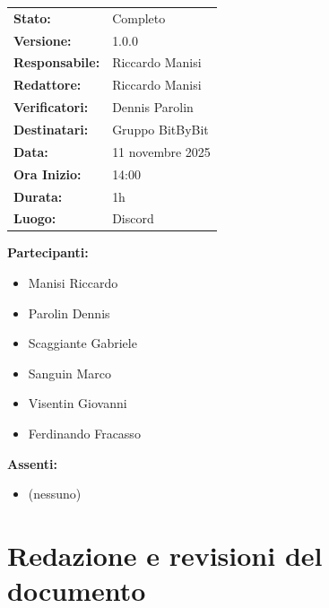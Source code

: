 \documentclass[a4paper,12pt]{article}
\begin{document}
\begin{tcolorbox}
\begin{tabularx}{\textwidth}{@{}l X@{}}
\textbf{Stato:} & Completo\\
\textbf{Versione:} & 1.0.0\\
\textbf{Responsabile:} & Riccardo Manisi\\
\textbf{Redattore:} & Riccardo Manisi \\
\textbf{Verificatori:} & Dennis Parolin\\
\textbf{Destinatari:} & Gruppo BitByBit\\
\textbf{Data:} & 11 novembre 2025 \\
\textbf{Ora Inizio:} & 14:00 \\
\textbf{Durata:} & 1h \\
\textbf{Luogo:} & Discord \\
\end{tabularx}
\end{tcolorbox}

\vspace{0.4cm}
\textbf{Partecipanti:}
\begin{itemize}
    \item Manisi Riccardo
    \item Parolin Dennis
    \item Scaggiante Gabriele
    \item Sanguin Marco
    \item Visentin Giovanni
    \item Ferdinando Fracasso
\end{itemize}

\textbf{Assenti:}
\begin{itemize}
    \item (nessuno)
\end{itemize}

\clearpage

\vspace{0.5cm}

\vspace{0.8cm}

\clearpage
\section*{Redazione e revisioni del documento}
\end{document}
